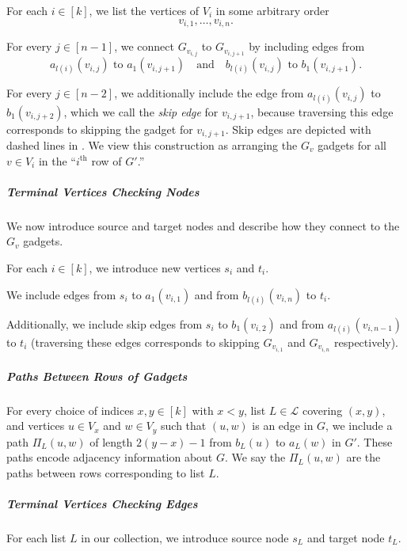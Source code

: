 \documentclass[11pt]{article}
\newcommand{\ca}{\mathcal}
\theoremstyle{definition}
\begin{document}

    For each $i\in [k]$, we list the vertices of $V_i$ in some arbitrary order
        \[v_{i,1}, \dots, v_{i,n}.\]



    For every $j\in [n-1]$, we connect $G_{v_{i,j}}$ to $G_{v_{i,j+1}}$ by  including edges from 
    \[a_{l(i)}(v_{i,j})\text{ to }a_1(v_{i,j+1})\quad \text{and} \quad b_{l(i)}(v_{i,j})\text{ to }b_1(v_{i,j+1}).\]
    
    For every $j\in [n-2]$, we additionally include the edge  from $a_{l(i)}(v_{i,j})$ to $b_{1}(v_{i,j+2})$, which we call the  \emph{skip edge} for $v_{i,j+1}$, because traversing this edge corresponds to skipping the gadget for $v_{i,j+1}$.
    Skip edges are depicted with dashed lines in .
    We view this construction as arranging the $G_v$ gadgets for all $v\in V_i$ in the ``$i^{\text{th}}$ row of $G'$.''



    \subparagraph{Terminal Vertices Checking Nodes}\hfill

    We now introduce source and target nodes and describe how they connect to the $G_v$ gadgets.

For each $i\in [k]$, we introduce new vertices $s_i$ and $t_i$.

    We include edges from $s_i$ to $a_1(v_{i,1})$ and from $b_{l(i)}(v_{i,n})$ to $t_i$.

    Additionally, we include skip edges from $s_i$ to $b_1(v_{i,2})$ and from $a_{l(i)}(v_{i,n-1})$ to $t_i$ (traversing these edges corresponds to skipping $G_{v_{i,1}}$ and $G_{v_{i,n}}$ respectively).

        \subparagraph{Paths Between Rows of Gadgets}\hfill
        
    For every choice of indices $x,y\in [k]$ with $x<y$, list $L\in\ca{L}$ covering $(x,y)$, and vertices $u\in V_x$  and $w\in V_y$ such that $(u,w)$ is an edge in $G$, we include a path 
        $\Pi_L(u,w)$ of length $2(y-x) - 1$ from $b_L(u)$ to $a_L(w)$ in $G'$.
    These paths encode adjacency information about $G$.
    We say the $\Pi_L(u,w)$ are the paths between rows corresponding to list $L$.
    

    \subparagraph{Terminal Vertices Checking Edges}\hfill

    For each list $L$ in our collection, we introduce source node $s_L$ and target node $t_L$.
    
\end{document}
